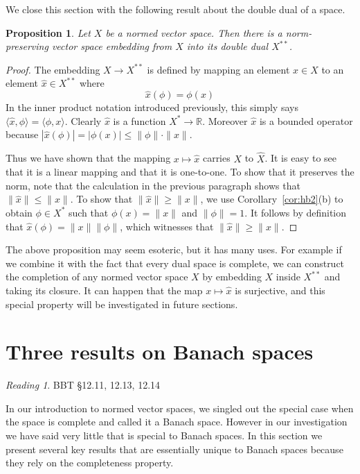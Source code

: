 \documentclass[11pt,oneside]{amsbook}
\newcommand{\RR}{{\mathbb R}}
\theoremstyle{definition}
\theoremstyle{plain}
\newtheorem{prop}[thm]{Proposition}
\theoremstyle{definition}
\theoremstyle{remark}
\newtheorem*{reading}{Reading}
\numberwithin{equation}{section}
\numberwithin{figure}{section}
\begin{document}
We close this section with the following result about the double dual of a space.

\begin{prop}
  Let $X$ be a normed vector space. Then there is a norm-preserving vector space embedding from $X$ into its double dual $X^{**}$.
\end{prop}

\begin{proof}
  The embedding $X\to X^{**}$ is defined by mapping an element $x\in X$ to an element $\hat x\in X^{**}$ where
  \[\hat x(\phi)=\phi(x)
  \]
  In the inner product notation introduced previously, this simply says $\langle\hat x,\phi\rangle=\langle\phi,x\rangle$. Clearly $\hat x$ is a function $X^*\to\RR$. Moreover $\hat x$ is a bounded operator because $|\hat x(\phi)|=|\phi(x)|\leq\|\phi\|\cdot\|x\|$.

  Thus we have shown that the mapping $x\mapsto\hat x$ carries $X$ to $\hat X$. It is easy to see that it is a linear mapping and that it is one-to-one. To show that it preserves the norm, note that the calculation in the previous paragraph shows that $\|\hat x\|\leq\|x\|$. To show that $\|\hat x\|\geq\|x\|$, we use Corollary~\ref{cor:hb2}(b) to obtain $\phi\in X^*$ such that $\phi(x)=\|x\|$ and $\|\phi\|=1$. It follows by definition that $\hat x(\phi)=\|x\|\|\phi\|$, which witnesses that $\|\hat x\|\geq\|x\|$.
\end{proof}

The above proposition may seem esoteric, but it has many uses. For example if we combine it with the fact that every dual space is complete, we can construct the completion of any normed vector space $X$ by embedding $X$ inside $X^{**}$ and taking its closure. It can happen that the map $x\mapsto\hat x$ is surjective, and this special property will be investigated in future sections.


\section{Three results on Banach spaces}

\begin{reading}
  BBT \S 12.11, 12.13, 12.14
\end{reading}

In our introduction to normed vector spaces, we singled out the special case when the space is complete and called it a Banach space. However in our investigation we have said  very little that is special to Banach spaces. In this section we present several key results that are essentially unique to Banach spaces because they rely on the completeness property.
\end{document}
